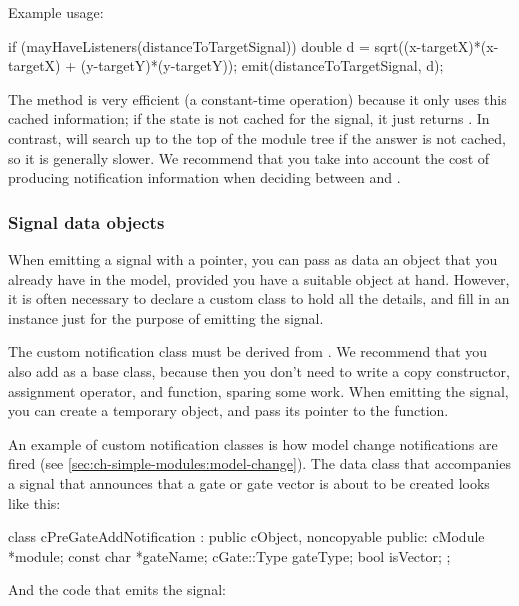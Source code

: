 Example usage:

\begin{cpp}
if (mayHaveListeners(distanceToTargetSignal))
{
    double d = sqrt((x-targetX)*(x-targetX) + (y-targetY)*(y-targetY));
    emit(distanceToTargetSignal, d);
}
\end{cpp}

The  method is very efficient (a constant-time
operation) because it only uses this cached information; if the state is
not cached for the signal, it just returns . In contrast,
 will search up to the top of the module tree if
the answer is not cached, so it is generally slower. We recommend that
you take into account the cost of producing notification information when
deciding between  and .


\subsubsection{Signal data objects}

When emitting a signal with a  pointer, you can pass as data
an object that you already have in the model, provided you have a suitable
object at hand. However, it is often necessary to declare a custom class
to hold all the details, and fill in an instance just for the purpose of
emitting the signal.

The custom notification class must be derived from .
We recommend that you also add  as a base class, because
then you don't need to write a copy constructor, assignment operator, and
 function, sparing some work. When emitting the signal, you
can create a temporary object, and pass its pointer to the 
function.

An example of custom notification classes is how model change notifications
are fired (see \ref{sec:ch-simple-modules:model-change}). The data class
that accompanies a signal that announces that a gate or gate vector is
about to be created looks like this:

\begin{cpp}
class cPreGateAddNotification : public cObject, noncopyable
{
  public:
    cModule *module;
    const char *gateName;
    cGate::Type gateType;
    bool isVector;
};
\end{cpp}

And the code that emits the signal:

